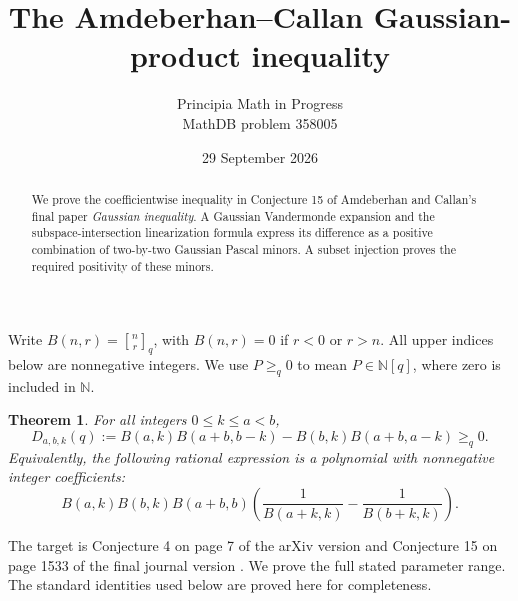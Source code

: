 \documentclass[11pt]{article}
\title{The Amdeberhan--Callan Gaussian-product inequality}
\author{Principia Math in Progress\\MathDB problem 358005}
\date{29 September 2026}
\newcommand{\qb}[2]{\genfrac{[}{]}{0pt}{}{#1}{#2}_q}
\newcommand{\NN}{\mathbb N}
\newtheorem{theorem}{Theorem}
\begin{document}
\maketitle
\begin{abstract}
We prove the coefficientwise inequality in Conjecture 15 of
Amdeberhan and Callan's final paper \emph{Gaussian inequality}.
A Gaussian Vandermonde expansion and the subspace-intersection
linearization formula express its difference as a positive combination
of two-by-two Gaussian Pascal minors. A subset injection proves the
required positivity of these minors.
\end{abstract}

Write \(B(n,r)=\qb nr\), with \(B(n,r)=0\) if \(r<0\) or \(r>n\).
All upper indices below are nonnegative integers. We use \(P\ge_q0\)
to mean \(P\in\NN[q]\), where zero is included in \(\NN\).

\begin{theorem}\label{thm:main}
For all integers \(0\le k\le a<b\),
\begin{equation}\label{eq:target}
D_{a,b,k}(q):=B(a,k)B(a+b,b-k)-B(b,k)B(a+b,a-k)\ge_q0.
\end{equation}
Equivalently, the following rational expression is a polynomial with
nonnegative integer coefficients:
\[
B(a,k)B(b,k)B(a+b,b)
\left(\frac1{B(a+k,k)}-\frac1{B(b+k,k)}\right).
\]
\end{theorem}

The target is Conjecture 4 on page 7 of the arXiv version
\cite{ACpre} and Conjecture 15 on page 1533 of the final journal
version \cite{AC}. We prove the full stated parameter range.
The standard identities used below are proved here for completeness.
\end{document}
